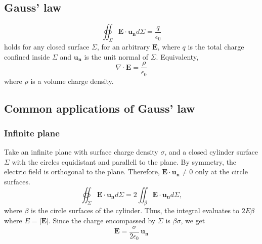 \documentclass[a4paper, 12pt]{article}
\renewcommand{\vec}[1]{\mathbf{#1}}
\newcommand{\E}{\ensuremath{\vec{E}}}
\newcommand{\e}{\ensuremath{\epsilon_0}}
\begin{document}
\subsection{Gauss' law}
    \begin{equation}
        \oiint_\Sigma \E\cdot\vec{u_n}d\Sigma = \frac{q}{\e}
    \end{equation}
    holds for any closed surface $\Sigma$, for an arbitrary $\E$, 
    where $q$ is the total charge confined inside $\Sigma$ and $\vec{u_n}$ is the unit normal of $\Sigma$. Equivalenty, 
    \begin{equation}
        \nabla \cdot \E = \frac{\rho}{\e}
    \end{equation}
    where $\rho$ is a volume charge density. 

\subsection{Common applications of Gauss' law}
    \subsubsection{Infinite plane}
        Take an infinite plane with surface charge density $\sigma$, 
        and a closed cylinder surface $\Sigma$ with the circles equidistant and parallell to the plane. 
        By symmetry, the electric field is orthogonal to the plane. Therefore, $\E\cdot\vec{u_n} \neq 0$ only at the circle surfaces. 
        \begin{equation*}
            \oiint_\Sigma \E\cdot\vec{u_n}d\Sigma = 2\iint_\beta \E\cdot\vec{u_n}d\Sigma,
        \end{equation*}
        where $\beta$ is the circle surfaces of the cylinder. Thus, the integral evaluates to $2E\beta$ where $E = |\E|$. 
        Since the charge encompassed by $\Sigma$ is $\beta\sigma$, we get
        \begin{equation}
            \E = \frac{\sigma}{2\e}\,\vec{u_n}
        \end{equation}
\end{document}
